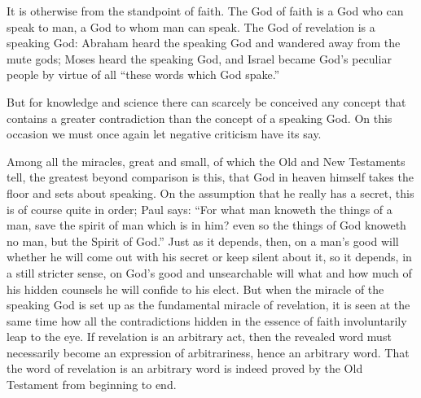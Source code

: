 \documentclass[12pt]{book}
\newcommand{\opage}[1]{\marginnote{\footnotesize\textit{[#1]}}}
\begin{document}
It is otherwise from the standpoint of faith. The God of faith is a God
who can speak to man, a God to whom man can speak. The God of revelation
is a speaking God: Abraham heard the speaking God and wandered away from
the mute gods; Moses heard the speaking God, and Israel became God's
peculiar people by virtue of all ``these words which God spake.''

\opage{178}\setcounter{footnote}{0}%
But for knowledge and science there can scarcely be conceived any concept
that contains a greater contradiction than the concept of a speaking God.
On this occasion we must once again let negative criticism have its say.

Among all the miracles, great and small, of which the Old and New
Testaments tell, the greatest beyond comparison is this, that God in
heaven himself takes the floor and sets about speaking. On the assumption
that he really has a secret, this is of course quite in order; Paul says:
``For what man knoweth the things of a man, save the spirit of man which
is in him? even so the things of God knoweth no man, but the Spirit of
God.'' Just as it depends, then, on a man's good will whether he will come
out with his secret or keep silent about it, so it depends, in a still
stricter sense, on God's good and unsearchable will what and how much of
his hidden counsels he will confide to his elect. But when the miracle of
the speaking God is set up as the fundamental miracle of revelation, it is
seen at the same time how all the contradictions hidden in the essence of
faith involuntarily leap to the eye. If revelation is an arbitrary act,
then the revealed word must necessarily become an expression of
arbitrariness, hence an arbitrary word. That the word of revelation is an
arbitrary word is indeed proved by the Old Testament from beginning to
end.
\end{document}
